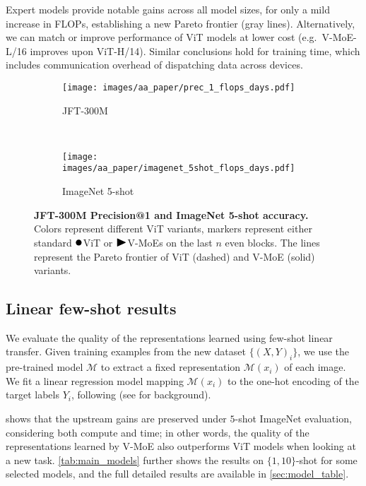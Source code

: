 \documentclass{article}
\newcommand{\densesym}{{\protect\scalebox{1.4}{$\bullet$}}}
\newcommand{\lastsym}{{\protect\scalebox{1.4}{$\blacktriangleright$}}}
\newcommand{\abbv}{{V-MoE}}
\begin{document}
Expert models provide notable gains across all model sizes, for only a mild increase in FLOPs, 
establishing a new Pareto frontier (gray lines). Alternatively, we can match or improve performance 
of ViT models at lower cost (e.g.\ \abbv{}-L/16 improves upon ViT-H/14).
Similar conclusions hold for training time, which includes communication overhead of dispatching data across devices.



\begin{figure}
\centering
\begin{subfigure}{.47\textwidth}
  \centering
  \texttt{[image: images/aa\_paper/prec\_1\_flops\_days.pdf]}
  \caption{JFT-300M}
  \label{im:upstream_vs_exaflops_and_days}
\end{subfigure}~~~
\begin{subfigure}{.47\textwidth}
  \centering
  \texttt{[image: images/aa\_paper/imagenet\_5shot\_flops\_days.pdf]}
  \caption{ImageNet 5-shot}
  \label{im:imagenet5shot_vs_exaflops_and_days}
\end{subfigure}
\caption{\textbf{JFT-300M Precision@1 and ImageNet 5-shot accuracy.}
Colors represent different ViT variants, markers represent either standard $\densesym{}$ViT or $\lastsym{}$V-MoEs on the last $n$ even blocks.
The lines represent the Pareto frontier of ViT (dashed) and V-MoE (solid) variants.
}
\label{im:performance_vs_exaflops_and_days}
\end{figure} 
\subsection{Linear few-shot results}
We evaluate the quality of the representations learned using few-shot linear transfer.
Given training examples from the new dataset $\{ (X, Y)_i \}$, we use the pre-trained model $\mathcal{M}$ to extract a fixed representation $\mathcal{M}(x_i)$ of each image. We fit a linear regression model mapping  $\mathcal{M}(x_i)$ to the one-hot encoding of the target labels $Y_i$, following \cite{dosovitskiy2020image} (see \cite[Chapter~5]{hastie2017elements} for background).

 shows that the upstream gains are preserved under $5$-shot ImageNet evaluation,
considering both compute and time; in other words, the quality of the representations learned by \abbv{} also outperforms
ViT models when looking at a new task. \cref{tab:main_models} further shows the results on $\{1, 10\}$-shot for some selected models,
and the full detailed results are available in \cref{sec:model_table}.
\end{document}
